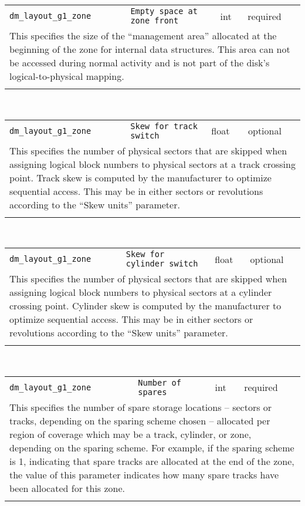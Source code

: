 \noindent 
\begin{tabular}{|p{\lpmodwidth}|p{\lpnamewidth}|p{0.5in}|p{0.5in}|}
\cline{1-4}
\texttt{dm\_layout\_g1\_zone} & \texttt{Empty space at zone front} & int & required \\ 
\cline{1-4}
\multicolumn{4}{|p{6in}|}{
This specifies the size of the ``management area'' allocated at the
beginning of the zone for internal data structures. This area can not
be accessed during normal activity and is not part of the disk's
logical-to-physical mapping.
}\\ 
\cline{1-4}
\multicolumn{4}{p{5in}}{}\\
\end{tabular}\\ 
\noindent 
\begin{tabular}{|p{\lpmodwidth}|p{\lpnamewidth}|p{0.5in}|p{0.5in}|}
\cline{1-4}
\texttt{dm\_layout\_g1\_zone} & \texttt{Skew for track switch} & float & optional \\ 
\cline{1-4}
\multicolumn{4}{|p{6in}|}{
This specifies the number of physical sectors that are skipped when
assigning logical block numbers to physical sectors at a track
crossing point. Track skew is computed by the manufacturer to
optimize sequential access. This may be in either sectors or
revolutions according to the ``Skew units'' parameter.
}\\ 
\cline{1-4}
\multicolumn{4}{p{5in}}{}\\
\end{tabular}\\ 
\noindent 
\begin{tabular}{|p{\lpmodwidth}|p{\lpnamewidth}|p{0.5in}|p{0.5in}|}
\cline{1-4}
\texttt{dm\_layout\_g1\_zone} & \texttt{Skew for cylinder switch} & float & optional \\ 
\cline{1-4}
\multicolumn{4}{|p{6in}|}{
This specifies the number of physical sectors that are skipped when
assigning logical block numbers to physical sectors at a cylinder
crossing point. Cylinder skew is computed by the manufacturer to
optimize sequential access. This may be in either sectors or
revolutions according to the ``Skew units'' parameter.
}\\ 
\cline{1-4}
\multicolumn{4}{p{5in}}{}\\
\end{tabular}\\ 
\noindent 
\begin{tabular}{|p{\lpmodwidth}|p{\lpnamewidth}|p{0.5in}|p{0.5in}|}
\cline{1-4}
\texttt{dm\_layout\_g1\_zone} & \texttt{Number of spares} & int & required \\ 
\cline{1-4}
\multicolumn{4}{|p{6in}|}{
This specifies the number of spare storage locations -- sectors or tracks,
depending on the sparing scheme chosen -- allocated per region of
coverage which may be a track, cylinder, or zone, depending on the
sparing scheme. For example, if the sparing scheme is 1, indicating
that spare tracks are allocated at the end of the zone, the value of
this parameter indicates how many spare tracks have been allocated for
this zone.
}\\ 
\cline{1-4}
\multicolumn{4}{p{5in}}{}\\
\end{tabular}\\ 
